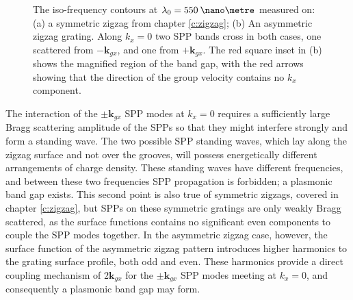 \begin{figure}
\begin{center}
\end{center}
\caption[The iso-frequency contours at $\lambda_0=550\:\nano\metre$, measured on a symmetric zigzag and an asymmetric zigzag grating.]{The iso-frequency contours at $\lambda_0=550\:\nano\metre$ measured on: (a) a symmetric zigzag from chapter \ref{c:zigzag}; (b) An asymmetric zigzag grating. Along $k_x=0$ two SPP bands cross in both cases, one scattered from $-\mathbf{k}_{gx}$, and one from $+\mathbf{k}_{gx}$. The red square inset in (b) shows the magnified region of the band gap, with the red arrows showing that the direction of the group velocity contains no $k_x$ component. \label{fig:asy550scattergrams}}
\end{figure}

The interaction of the $\pm\mathbf{k}_{gx}$ SPP modes at $k_x=0$ requires a sufficiently large Bragg scattering amplitude of the SPPs so that they might interfere strongly and form a standing wave. The two possible SPP standing waves, which lay along the zigzag surface and not over the grooves, will possess energetically different arrangements of charge density. These standing waves have different frequencies, and between these two frequencies SPP propagation is forbidden; a plasmonic band gap exists. This second point is also true of symmetric zigzags, covered in chapter \ref{c:zigzag}, but SPPs on these symmetric gratings are only weakly Bragg scattered, as the surface functions contains no significant even components to couple the SPP modes together. In the asymmetric zigzag case, however, the surface function of the asymmetric zigzag pattern introduces higher harmonics to the grating surface profile, both odd and even. These harmonics provide a direct coupling mechanism of $2\mathbf{k}_{gx}$ for the $\pm\mathbf{k}_{gx}$ SPP modes meeting at $k_x=0$, and consequently a plasmonic band gap may form.


